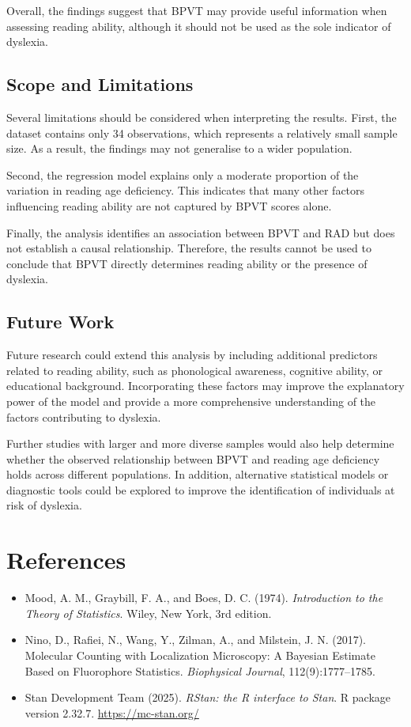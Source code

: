 \documentclass[11pt, a4paper]{article}
\begin{document}
Overall, the findings suggest that BPVT may provide useful information when assessing reading ability, although it should not be used as the sole indicator of dyslexia.

\subsection{Scope and Limitations}

Several limitations should be considered when interpreting the results. First, the dataset contains only 34 observations, which represents a relatively small sample size. As a result, the findings may not generalise to a wider population.

Second, the regression model explains only a moderate proportion of the variation in reading age deficiency. This indicates that many other factors influencing reading ability are not captured by BPVT scores alone.

Finally, the analysis identifies an association between BPVT and RAD but does not establish a causal relationship. Therefore, the results cannot be used to conclude that BPVT directly determines reading ability or the presence of dyslexia.

\subsection{Future Work}

Future research could extend this analysis by including additional predictors related to reading ability, such as phonological awareness, cognitive ability, or educational background. Incorporating these factors may improve the explanatory power of the model and provide a more comprehensive understanding of the factors contributing to dyslexia.

Further studies with larger and more diverse samples would also help determine whether the observed relationship between BPVT and reading age deficiency holds across different populations. In addition, alternative statistical models or diagnostic tools could be explored to improve the identification of individuals at risk of dyslexia.

\section*{References}

\begin{itemize}
\item Mood, A. M., Graybill, F. A., and Boes, D. C. (1974). \textit{Introduction to the Theory of Statistics}. Wiley, New York, 3rd edition.
\item Nino, D., Rafiei, N., Wang, Y., Zilman, A., and Milstein, J. N. (2017). Molecular Counting with Localization Microscopy: A Bayesian Estimate Based on Fluorophore Statistics. \textit{Biophysical Journal}, 112(9):1777--1785.
\item Stan Development Team (2025). \textit{RStan: the R interface to Stan}. R package version 2.32.7. \url{https://mc-stan.org/}
\end{itemize}
\end{document}
